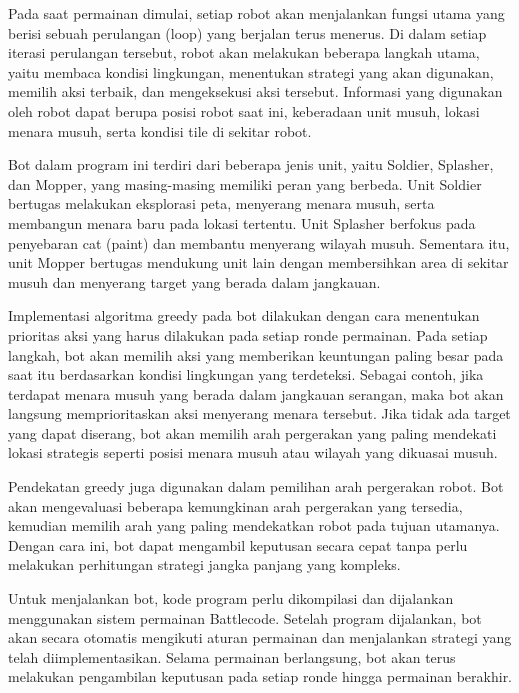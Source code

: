 \documentclass{article}
\begin{document}
Pada saat permainan dimulai, setiap robot akan menjalankan fungsi utama yang berisi sebuah perulangan 
(loop) yang berjalan terus menerus. Di dalam setiap iterasi perulangan tersebut, robot akan melakukan 
beberapa langkah utama, yaitu membaca kondisi lingkungan, menentukan strategi yang akan digunakan, 
memilih aksi terbaik, dan mengeksekusi aksi tersebut. Informasi yang digunakan oleh robot dapat berupa 
posisi robot saat ini, keberadaan unit musuh, lokasi menara musuh, serta kondisi tile di sekitar robot.

Bot dalam program ini terdiri dari beberapa jenis unit, yaitu Soldier, Splasher, dan Mopper, yang 
masing-masing memiliki peran yang berbeda. Unit Soldier bertugas melakukan eksplorasi peta, 
menyerang menara musuh, serta membangun menara baru pada lokasi tertentu. Unit Splasher berfokus 
pada penyebaran cat (paint) dan membantu menyerang wilayah musuh. Sementara itu, unit Mopper 
bertugas mendukung unit lain dengan membersihkan area di sekitar musuh dan menyerang target yang 
berada dalam jangkauan.

Implementasi algoritma greedy pada bot dilakukan dengan cara menentukan prioritas aksi yang harus 
dilakukan pada setiap ronde permainan. Pada setiap langkah, bot akan memilih aksi yang memberikan 
keuntungan paling besar pada saat itu berdasarkan kondisi lingkungan yang terdeteksi. Sebagai contoh, 
jika terdapat menara musuh yang berada dalam jangkauan serangan, maka bot akan langsung 
memprioritaskan aksi menyerang menara tersebut. Jika tidak ada target yang dapat diserang, bot akan 
memilih arah pergerakan yang paling mendekati lokasi strategis seperti posisi menara musuh atau wilayah 
yang dikuasai musuh.

Pendekatan greedy juga digunakan dalam pemilihan arah pergerakan robot. Bot akan mengevaluasi 
beberapa kemungkinan arah pergerakan yang tersedia, kemudian memilih arah yang paling mendekatkan 
robot pada tujuan utamanya. Dengan cara ini, bot dapat mengambil keputusan secara cepat tanpa perlu 
melakukan perhitungan strategi jangka panjang yang kompleks.

Untuk menjalankan bot, kode program perlu dikompilasi dan dijalankan menggunakan sistem permainan 
Battlecode. Setelah program dijalankan, bot akan secara otomatis mengikuti aturan permainan dan 
menjalankan strategi yang telah diimplementasikan. Selama permainan berlangsung, bot akan terus 
melakukan pengambilan keputusan pada setiap ronde hingga permainan berakhir.


\newpage
\end{document}
